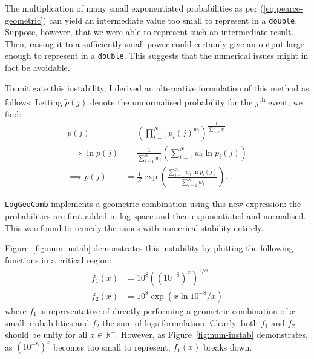 \documentclass[12pt,a4paper,twoside,openright]{report}
\begin{document}
The multiplication of many small exponentiated probabilities as per
(\ref{eq:pearce-geometric}) can yield an intermediate value too small to
represent in a \texttt{double}. Suppose, however, that we were able to represent
such an intermediate result. Then, raising it to a sufficiently small power
could certainly give an output large enough to represent in a \texttt{double}.
This suggests that the numerical issues might in fact be avoidable.

To mitigate this instability, I derived an alternative formulation of this
method as follows. Letting $\widetilde{p}(j)$ denote the unnormalised
probability for the $j$\textsuperscript{th} event, we find:
\begin{align*}
  \widetilde{p}(j) &= \left( \prod_{i=1}^N p_i(j)^{w_i}
  \right)^{\frac{1}{\sum_{i=1}^N w_i}} \\[3mm]
  \implies \ln{\widetilde{p}(j)} &= \frac{1}{\sum_{i = 1}^N w_i} \left( \sum_{i
  = 1}^N w_i \ln{p_i(j)} \right) \\[3mm]
  \implies p(j) &= \frac{1}{Z} \exp \left( \frac{\sum_{i = 1}^N w_i \ln{ p_i(j)
  }}{ \sum_{i = 1}^N w_i } \right).
\end{align*}

\texttt{LogGeoComb} implements a geometric combination using this new
expression: the probabilities are first added in log space and then
exponentiated and normalised. This was found to remedy the issues with numerical
stability entirely.

Figure~\ref{fig:num-instab} demonstrates this instability by plotting the
following functions in a critical region:
\begin{align*}
  f_1(x) &= 10^8 \left( \left( 10^{-8} \right)^x \right)^{1/x} \\
  f_2(x) &= 10^8 \exp( x \ln{10^{-8}} / x)
\end{align*}
where $f_1$ is representative of directly performing a geometric combination of
$x$ small probabilities and $f_2$ the sum-of-logs formulation. Clearly, both
$f_1$ and $f_2$ should be unity for all $x \in \mathbb{R}^+$. However, as
Figure~\ref{fig:num-instab} demonstrates, as $(10^{-8})^x$ becomes too small to
represent, $f_1(x)$ breaks down.
\end{document}
